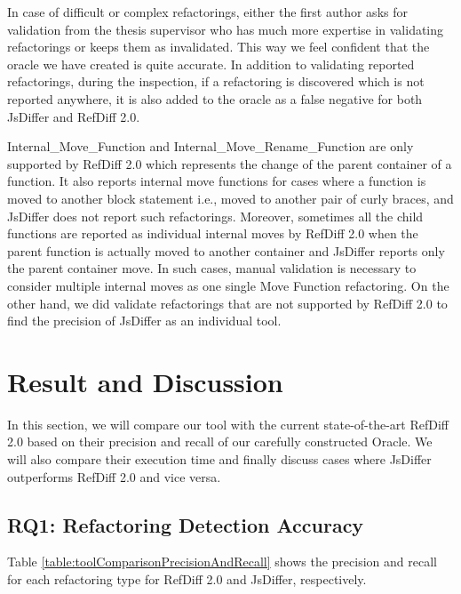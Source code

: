 \documentclass[letterpaper,12pt,onecolumn,final]{report}
\begin{document}
In case of difficult or complex refactorings, either the first author asks for validation from the thesis supervisor who has much more expertise in validating refactorings or keeps them as invalidated. This way we feel confident that the oracle we have created is quite accurate. In addition to validating reported refactorings, during the inspection, if a refactoring is discovered which is not reported anywhere, it is also added to the oracle as a false negative for both JsDiffer and RefDiff 2.0. 

Internal\_Move\_Function and Internal\_Move\_Rename\_Function are only supported by RefDiff 2.0 which represents the change of the parent container of a function. It also reports internal move functions for cases where a function is moved to another block statement i.e., moved to another pair of curly braces, and JsDiffer does not report such refactorings. Moreover, sometimes all the child functions are reported as individual internal moves by RefDiff 2.0 when the parent function is actually moved to another container and JsDiffer reports only the parent container move. In such cases, manual validation is necessary to consider multiple internal moves as one single Move Function refactoring. On the other hand, we did validate refactorings that are not supported by RefDiff 2.0 to find the precision of JsDiffer as an individual tool.

\section {Result and Discussion}

In this section, we will compare our tool with the current state-of-the-art RefDiff 2.0 based on their precision and recall of our carefully constructed Oracle. We will also compare their execution time and finally discuss cases where JsDiffer outperforms RefDiff 2.0 and vice versa.

\subsection{RQ1: Refactoring Detection Accuracy}

Table \ref{table:toolComparisonPrecisionAndRecall} shows the precision and recall for each refactoring type for RefDiff 2.0 and JsDiffer, respectively. 
\end{document}
